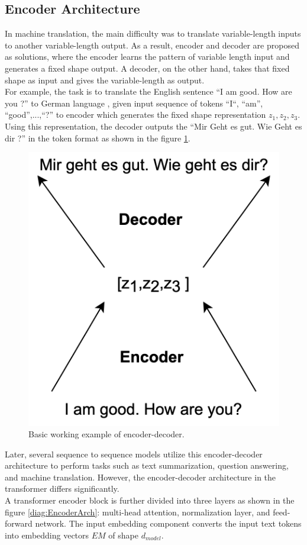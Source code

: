 \documentclass[%
	BCOR=8mm, %
	DIV=12,
	toc=bibliography, %
	toc=listof, %
	oneside, %
	egregdoesnotlikesansseriftitles, %
	]{scrbook}
\begin{document}
\subsection{Encoder Architecture}
In machine translation, the main difficulty was to translate variable-length inputs to another variable-length output. As a result, encoder and decoder are proposed as solutions, where the encoder learns the pattern of variable length input and generates a fixed shape output. A decoder, on the other hand, takes that fixed shape as input and gives the variable-length as output. \\
For example, the task is to translate the English sentence ``I am good. How are you ?'' to German language , given input sequence of tokens ``I``, ``am'', ``good'',...,``?'' to encoder which generates the fixed shape representation $z_{1},z_{2},z_{3}$. Using this representation, the decoder outputs the ``Mir Geht es gut. Wie Geht es dir ?'' in the token format as shown in the figure \ref{diag:EncoderDecoderExp}.\\
\begin{figure}[H]
    \centering
    \includegraphics[width=.25\textwidth]{img/EncoderDecoder2.png}
    \caption[Basic example of encoder-decoder working]{Basic working example of encoder-decoder.}
    \label{diag:EncoderDecoderExp}
\end{figure}
 Later, several sequence to sequence models utilize this encoder-decoder architecture to perform tasks such as text summarization, question answering, and machine translation. However, the encoder-decoder architecture in the transformer differs significantly.\\
A transformer encoder block is further divided into three layers as shown in the figure \ref{diag:EncoderArch}: multi-head attention, normalization layer, and feed-forward network. The input embedding component converts the input text tokens into embedding vectors $EM$ of shape $d_{model}$.
\end{document}
